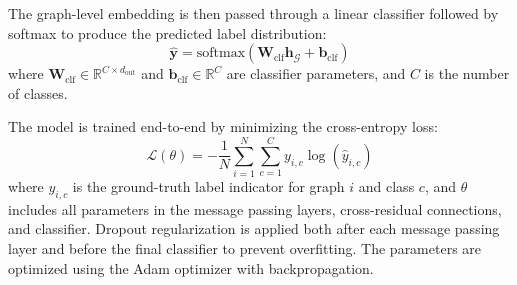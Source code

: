 The graph-level embedding is then passed through a linear classifier followed by softmax to produce the predicted label distribution:
\begin{equation}
\hat{\mathbf{y}} = \text{softmax}\left(\mathbf{W}_{\text{clf}} \mathbf{h}_{\mathcal{G}} + \mathbf{b}_{\text{clf}}\right)
\end{equation}
where $\mathbf{W}_{\text{clf}} \in \mathbb{R}^{C \times d_{\text{out}}}$ and $\mathbf{b}_{\text{clf}} \in \mathbb{R}^{C}$ are classifier parameters, and $C$ is the number of classes.

The model is trained end-to-end by minimizing the cross-entropy loss:
\begin{equation}
\mathcal{L}(\theta) = -\frac{1}{N}\sum_{i=1}^{N} \sum_{c=1}^{C} y_{i,c} \log(\hat{y}_{i,c})
\end{equation}
where $y_{i,c}$ is the ground-truth label indicator for graph $i$ and class $c$, and $\theta$ includes all parameters in the message passing layers, cross-residual connections, and classifier. Dropout regularization is applied both after each message passing layer and before the final classifier to prevent overfitting. The parameters are optimized using the Adam optimizer \cite{kingma2014adam} with backpropagation.
